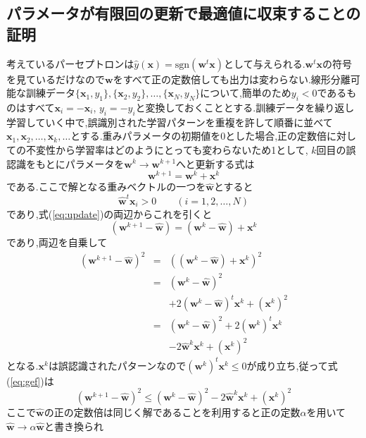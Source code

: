 \documentclass[twocolumn]{jarticle}
\begin{document}
\subsection*{パラメータが有限回の更新で最適値に収束することの証明}
考えているパーセプトロンは$\hat{y}(\bm{x}) = \mathrm{sgn}({\bm{w}^t\bm{x}})$として与えられる.$\bm{w}^t\bm{x}$の符号を見ているだけなので$\bm{w}$をすべて正の定数倍しても出力は変わらない.線形分離可能な訓練データ$\{\bm{x}_1, y_1\}, \{\bm{x}_2, y_2\}, \dots, \{\bm{x}_N, y_N\}$について,簡単のため$y_i < 0$であるものはすべて$\bm{x}_i = -\bm{x}_i$, $y_i = -y_i$と変換しておくこととする.訓練データを繰り返し学習していく中で,誤識別された学習パターンを重複を許して順番に並べて$\bm{x}_1, \bm{x}_2, \dots, \bm{x}_k, \dots$とする.重みパラメータの初期値を0とした場合,正の定数倍に対しての不変性から学習率はどのようにとっても変わらないため1として, $k$回目の誤認識をもとにパラメータを$\bm{w}^k \to \bm{w}^{k + 1}$へと更新する式は
\begin{equation}
  \bm{w}^{k + 1} = \bm{w}^k + \bm{x}^k
  \label{eq:update}
\end{equation}
である.ここで解となる重みベクトルの一つを$\hat{\bm{w}}$とすると
\begin{equation}
  \hat{\bm{w}}^t\bm{x}_i > 0 \qquad (i = 1, 2, \dots, N)
\end{equation}
であり,式(\ref{eq:update})の両辺からこれを引くと
\begin{equation}
  (\bm{w}^{k + 1} - \hat{\bm{w}}) = (\bm{w}^{k} - \hat{\bm{w}}) + \bm{x}^k
\end{equation}
であり,両辺を自乗して
\begin{eqnarray}
  (\bm{w}^{k + 1} - \hat{\bm{w}})^2 &=& ((\bm{w}^{k} - \hat{\bm{w}}) + \bm{x}^k)^2 \\
  &=& (\bm{w}^{k} - \hat{\bm{w}})^2 \nonumber \\
   &&+ 2(\bm{w}^{k} - \hat{\bm{w}})^t \bm{x}^k + (\bm{x}^k)^2 \\
  &=&  (\bm{w}^{k} - \hat{\bm{w}})^2 + 2(\bm{w}^k)^t\bm{x}^k \nonumber \\
   &&  - 2 \hat{\bm{w}}^k\bm{x}^k + (\bm{x}^k)^2
\label{eq:gef}
\end{eqnarray}
となる.$\bm{x}^k$は誤認識されたパターンなので$(\bm{w}^k)^t\bm{x}^k \le 0$が成り立ち,従って式(\ref{eq:gef})は
\begin{equation}
  (\bm{w}^{k + 1} - \hat{\bm{w}})^2 \le (\bm{w}^{k} - \hat{\bm{w}})^2 - 2 \hat{\bm{w}}^k\bm{x}^k + (\bm{x}^k)^2
\end{equation}
ここで$\hat{\bm{w}}$の正の定数倍は同じく解であることを利用すると正の定数$\alpha$を用いて$\hat{\bm{w}} \to \alpha \hat{\bm{w}}$と書き換られ
\end{document}
